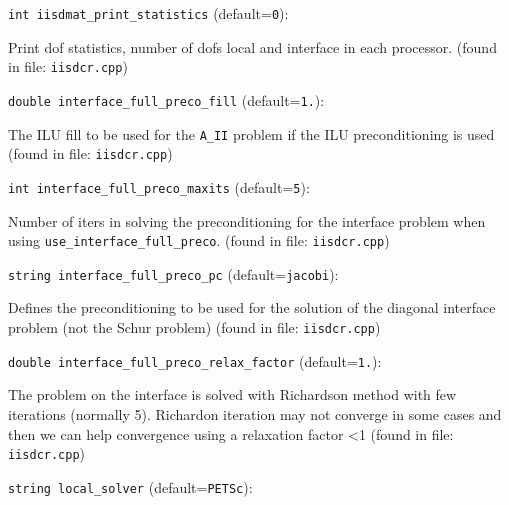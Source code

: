 \item\verb+int iisdmat_print_statistics+ {\rm(default=\verb|0|)}:

Print dof statistics, number of dofs local and interface in each
processor. 
 (found in file: \verb+iisdcr.cpp+)
\item\verb+double interface_full_preco_fill+ {\rm(default=\verb|1.|)}:

The ILU fill to be used for the \verb+A_II+ problem if the
ILU preconditioning is used
 (found in file: \verb+iisdcr.cpp+)
\item\verb+int interface_full_preco_maxits+ {\rm(default=\verb|5|)}:

Number of iters in solving the preconditioning for the 
interface problem when using \verb+use_interface_full_preco+. 
 (found in file: \verb+iisdcr.cpp+)
\item\verb+string interface_full_preco_pc+ {\rm(default=\verb|jacobi|)}:

Defines the preconditioning to be used for the solution
of the diagonal interface problem (not the Schur problem)
 (found in file: \verb+iisdcr.cpp+)
\item\verb+double interface_full_preco_relax_factor+ {\rm(default=\verb|1.|)}:

The problem on the interface is solved with Richardson method
with few iterations (normally 5). Richardon iteration may not
converge in some cases and then we can help convergence using a
relaxation factor <1
 (found in file: \verb+iisdcr.cpp+)
\item\verb+string local_solver+ {\rm(default=\verb|PETSc|)}:

